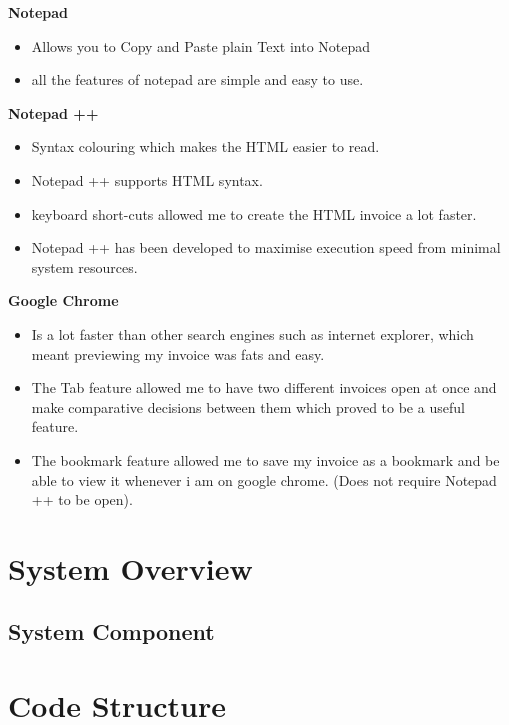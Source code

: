 \textbf{Notepad}
\begin{itemize}
	\item Allows you to Copy and Paste plain Text into Notepad
	\item all the features of notepad are simple and easy to use.
\end{itemize}
\vspace{5mm}

\textbf{Notepad ++}
\begin{itemize}
	\item Syntax colouring which makes the HTML easier to read.
	\item Notepad ++ supports HTML syntax.
	\item keyboard short-cuts allowed me to create the HTML invoice a lot faster.
	\item Notepad ++ has been developed to maximise execution speed from minimal system resources.
\end{itemize}
\vspace{5mm}

\textbf{Google Chrome}
\begin{itemize}
	\item Is a lot faster than other search engines such as internet explorer, which meant previewing my invoice was fats and easy.
	\item The Tab feature allowed me to have two different invoices open at once and make comparative decisions between them which proved to be a useful feature.
	\item The bookmark feature allowed me to save my invoice as a bookmark and be able to view it whenever i am on google chrome. (Does not require Notepad ++ to be open).
\end{itemize}

\section{System Overview}

\subsection{System Component}

\section{Code Structure}

